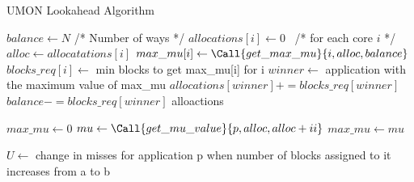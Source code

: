\begin{algorithm}[ht]
\caption{UMON Lookahead Algorithm}
\label{alg:algorithms:ucp}
\begin{algorithmic}[1]
\State $balance\gets N$ /* Number of ways */
\State $allocations[i]\gets 0$  /* for each core $i$ */
        \State $alloc\gets allocatations[i]$
        \State $max\_mu[i]\gets \Call{get\_max\_mu}{i, alloc, balance}$
        \State $blocks\_req[i]\gets$ min blocks to get max\_mu[i] for i
    \EndFor
    \State $winner\gets$ application with the maximum value of max\_mu
    \State $allocations[winner] += blocks\_req[winner]$
    \State $balance -= blocks\_req[winner]$
\EndWhile
\State \Return alloactions
\State

    \State $max\_mu\gets 0$
        \State $mu\gets \Call{get\_mu\_value}{p, alloc, alloc+ii}$
            \State $max\_mu\gets mu$
        \EndIf
    \EndFor
    \State {}
\EndFunction
\State

    \State $U\gets$ change in misses for application p when number of blocks assigned to it increases from a to b
    \State {}
\EndFunction
\end{algorithmic}
\end{algorithm}

